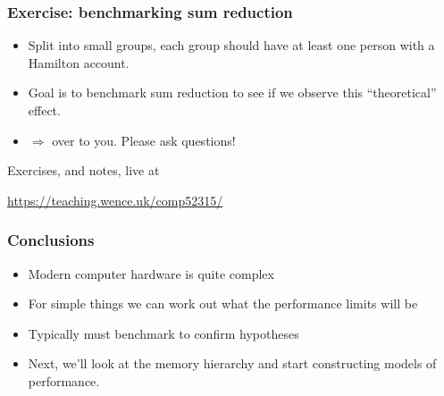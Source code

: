 \documentclass[presentation,aspectratio=43,10pt]{beamer}
\begin{document}
\begin{frame}
  \frametitle{Exercise: benchmarking sum reduction}

  \begin{itemize}
  \item Split into small groups, each group should have at least one
    person with a Hamilton account.
  \item Goal is to benchmark sum reduction to see if we observe this
    ``theoretical'' effect.
  \item $\Rightarrow$ over to you. Please ask questions!
  \end{itemize}
  \begin{center}
    Exercises, and notes, live at

    \url{https://teaching.wence.uk/comp52315/}
  \end{center}
\end{frame}

\begin{frame}
  \frametitle{Conclusions}
  \begin{itemize}
  \item Modern computer hardware is quite complex
  \item For simple things we can work out what the performance limits
    will be
  \item Typically must benchmark to confirm hypotheses
  \item Next, we'll look at the memory hierarchy and start
    constructing models of performance.
  \end{itemize}
\end{frame}
\end{document}
